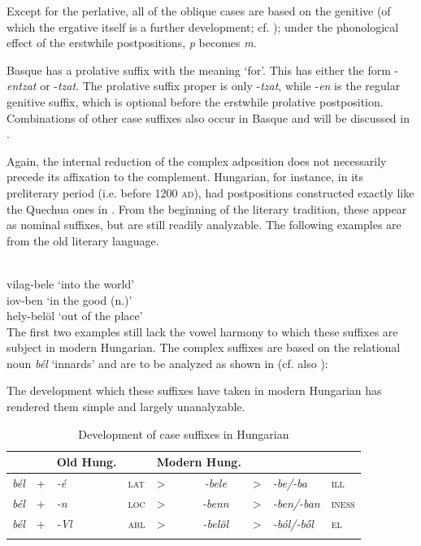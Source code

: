 Except for the perlative, all of the oblique cases are based on the genitive (of which the ergative itself is a further development; cf. ); under the phonological effect of the erstwhile postpositions, \textit{p} becomes \textit{m}. 

Basque has a prolative suffix with the meaning ‘for’. This has either the form -\textit{entzat} or -\textit{tzat}. The prolative suffix proper is only -\textit{tzat}, while -\textit{en} is the regular genitive suffix, which is optional before the erstwhile prolative postposition. Combinations of other case suffixes also occur in Basque and will be discussed in .

Again, the internal reduction of the complex adposition does not necessarily precede its affixation to the complement. Hungarian, for instance, in its preliterary period (i.e. before 1200 \textsc{ad}), had postpositions constructed exactly like the Quechua ones in . From the beginning of the literary tradition, these appear as nominal suffixes, but are still readily analyzable. The following examples are from the old literary language.

\ea\label{ex:E58}
\\
 \ea vilag-bele  
 \glt ‘into the world’\\
\ex iov-ben
\glt ‘in the good (n.)’\\
\ex hely-belöl 
\glt ‘out of the place’\\
\z
\z
\noindent The first two examples still lack the vowel harmony to which these suffixes are subject in modern Hungarian. The complex suffixes are based on the relational noun \textit{bél} ‘innards’ and are to be analyzed as shown in  (cf. also \citealt[118--121]{Kahr1976}):

The development which these suffixes have taken in modern Hungarian has rendered them simple and largely unanalyzable.

\begin{table}
\begin{tabular}{lllllclll}
\lsptoprule
\multicolumn{4}{l}{components} &  & Old Hung. &  & \multicolumn{2}{l}{Modern Hung.}\\
\midrule
\itshape bél & + & \itshape {}-é & \textsc{lat}{}{} & {\textgreater} & \itshape {}-bele & {\textgreater} & \itshape {}-be/-ba & \scshape ill\\
\itshape bél & + & \itshape {}-n & \textsc{loc}{}{} & {\textgreater} & \itshape {}-benn & {\textgreater} & \itshape {}-ben/-ban & \scshape iness\\
\itshape bél & + & \itshape {}-Vl & \textsc{abl}{}{} & {\textgreater} & \itshape {}-belöl & {\textgreater} & \itshape {}-ból/-ből & \scshape el\\
\lspbottomrule
\end{tabular}
\caption{Development of case suffixes in Hungarian}\label{tab:DevHung}
\end{table}



